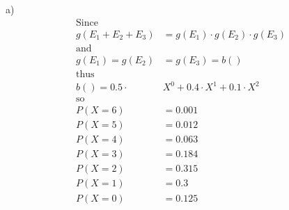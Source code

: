 \documentclass[11pt]{article}
\begin{document}
a)
\begin{align*}
\text{Since}&\\
g(E_1 + E_2 + E_3) &= g(E_1) \cdot g(E_2) \cdot g(E_3)\\
\text{and}&\\
g(E_1) = g(E_2) &= g(E_3) = b()\\
\text{thus}&\\
b() = 0.5\cdot &X^0 + 0.4\cdot X^1 + 0.1\cdot X^2\\
\text{so}&\\
P(X = 6) &= 0.001\\
P(X = 5) &= 0.012\\
P(X = 4) &= 0.063\\
P(X = 3) &= 0.184\\
P(X = 2) &= 0.315\\
P(X = 1) &= 0.3\\
P(X = 0) &= 0.125\\
\end{align*}
\end{document}
